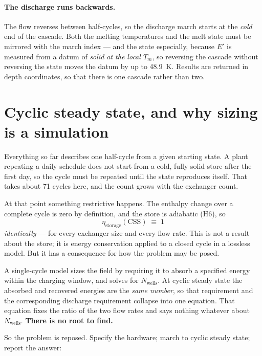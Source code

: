 \documentclass[11pt,a4paper]{article}
\newcommand{\Tm}{\ensuremath{T_{m}}}
\newcommand{\Nwells}{\ensuremath{N_{\mathrm{wells}}}}
\begin{document}
\paragraph{The discharge runs backwards.}
The flow reverses between half-cycles, so the discharge march starts at the
\emph{cold} end of the cascade. Both the melting temperatures and the melt state
must be mirrored with the march index --- and the state especially, because $E'$
is measured from a datum of \emph{solid at the local $\Tm$}, so reversing the
cascade without reversing the state moves the datum by up to
\SI{48.9}{\kelvin}. Results are returned in depth coordinates, so that there is
one cascade rather than two.

\section{Cyclic steady state, and why sizing is a simulation}
\label{sec:css}

Everything so far describes one half-cycle from a given starting state. A plant
repeating a daily schedule does not start from a cold, fully solid store after
the first day, so the cycle must be repeated until the state reproduces itself.
That takes about \num{71} cycles here, and the count grows with the exchanger count.

At that point something restrictive happens. The enthalpy change over a
complete cycle is zero by definition, and the store is adiabatic (H6), so
\begin{equation}
  \eta_{\mathrm{storage}}(\mathrm{CSS}) \;\equiv\; 1
  \label{eq:unity}
\end{equation}
\emph{identically} --- for every exchanger size and every flow rate. This is not
a result about the store; it is energy conservation applied to a closed cycle in
a lossless model. But it has a consequence for how the problem may be posed.

A single-cycle model sizes the field by requiring it to absorb a specified
energy within the charging window, and solves for $\Nwells$. At cyclic steady
state the absorbed and recovered energies are the \emph{same number}, so that
requirement and the corresponding discharge requirement collapse into one
equation. That equation fixes the ratio of the two flow rates and says nothing
whatever about $\Nwells$. \textbf{There is no root to find.}

So the problem is reposed. Specify the hardware; march to cyclic steady state;
report the answer:
\end{document}
